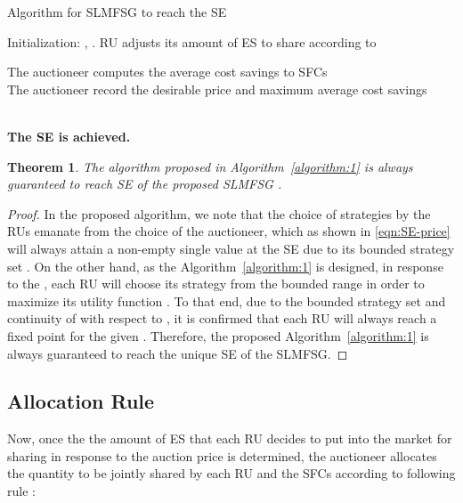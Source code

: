 \documentclass[journal,10pt]{IEEEtran}
\newtheorem{theorem}{\bf Theorem}
\begin{document}
\begin{algorithm}[h]
\caption{Algorithm for SLMFSG to reach the SE}
\label{algorithm:1}
\begin{algorithmic}[1]
\small
\STATE Initialization: , .
        \STATE RU  adjusts its amount of ES  to share according to
        
   \ENDFOR
    \STATE The auctioneer computes the average cost savings to SFCs
         \\
     \IF {}
         \STATE The auctioneer record the desirable price and maximum average cost savings
         
     \ENDIF
\ENDFOR\\
\textbf{The SE  is achieved.}
\end{algorithmic}
\end{algorithm}
\begin{theorem}
The algorithm proposed in Algorithm~\ref{algorithm:1} is always guaranteed to reach SE of the proposed SLMFSG .
\label{theorem:2}
\end{theorem}
\begin{proof}
In the proposed algorithm, we note that the choice of strategies by the RUs emanate from the choice  of the auctioneer, which as shown in \eqref{eqn:SE-price} will always attain a non-empty single value  at the SE due to its bounded strategy set . On the other hand, as the Algorithm~\ref{algorithm:1} is designed, in response to the , each RU  will choose its strategy  from the bounded range  in order to maximize its utility function . To that end, due to the bounded strategy set and continuity of  with respect to , it is confirmed that each RU  will always reach a fixed point  for the given . Therefore, the proposed Algorithm~\ref{algorithm:1} is always guaranteed to reach the unique SE of the SLMFSG.
\end{proof}
\subsection{Allocation Rule}\label{sec:allocation} Now, once the the amount of ES  that each RU  decides to put into the market for sharing in response to the auction price  is determined, the auctioneer allocates the quantity  to be jointly shared by each RU  and the SFCs according to following rule \cite{Huang-doubleauction:2002}:
\end{document}
